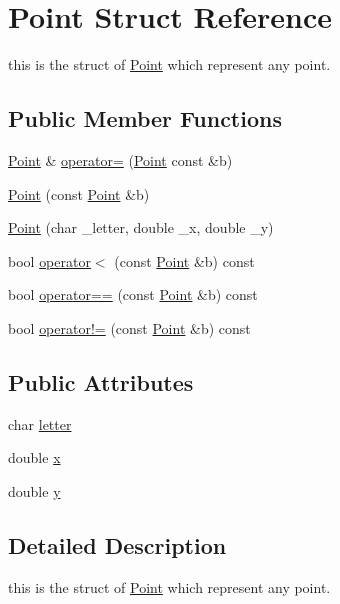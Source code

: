 \hypertarget{struct_point}{}\section{Point Struct Reference}
\label{struct_point}


this is the struct of \hyperlink{struct_point}{Point} which represent any point.  


\subsection*{Public Member Functions}
\begin{DoxyCompactItemize}
\item 
\hyperlink{struct_point}{Point} \& \hyperlink{struct_point_a747f1de8a657c95d9afc2976ef47829b}{operator=} (\hyperlink{struct_point}{Point} const \&b)
\item 
\hyperlink{struct_point_a6e3c30c51464aef7ffc341246fd5f350}{Point} (const \hyperlink{struct_point}{Point} \&b)
\item 
\hyperlink{struct_point_ab42957117da0adbb5d5838106e3c7a0c}{Point} (char \+\_\+letter, double \+\_\+x, double \+\_\+y)
\item 
bool \hyperlink{struct_point_ad7e2bd4ef0f76e601a88b319a9197de1}{operator$<$} (const \hyperlink{struct_point}{Point} \&b) const
\item 
bool \hyperlink{struct_point_affed2941d46a0f1bfe40540506e99e5e}{operator==} (const \hyperlink{struct_point}{Point} \&b) const
\item 
bool \hyperlink{struct_point_a1b3079414ffe1de3dbc74516a71a4007}{operator!=} (const \hyperlink{struct_point}{Point} \&b) const
\end{DoxyCompactItemize}
\subsection*{Public Attributes}
\begin{DoxyCompactItemize}
\item 
char \hyperlink{struct_point_ac0df42bfe41b1cc24cca14a53b96ae16}{letter}
\item 
double \hyperlink{struct_point_ab99c56589bc8ad5fa5071387110a5bc7}{x}
\item 
double \hyperlink{struct_point_afa38be143ae800e6ad69ce8ed4df62d8}{y}
\end{DoxyCompactItemize}


\subsection{Detailed Description}
this is the struct of \hyperlink{struct_point}{Point} which represent any point. 

